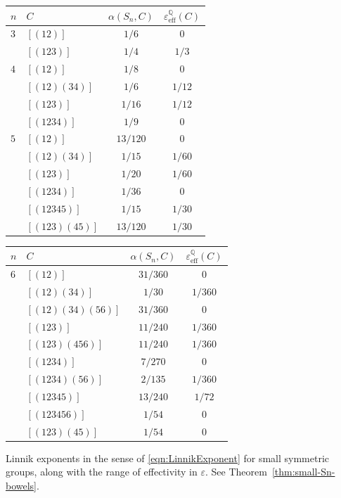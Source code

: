 \documentclass[12pt]{amsart}
\theoremstyle{definition} \newtheorem{definition}[theorem]{Definition}
\theoremstyle{example} \newtheorem{example}[theorem]{Example}
\theoremstyle{remark} \newtheorem{remark}{Remark}[theorem]
\numberwithin{equation}{section}
\numberwithin{theorem}{section}
\renewcommand{\epsilon}{\varepsilon}
\begin{document}
	{\tiny \begin{table}[h]
		\begin{minipage}[t]{0.35\textwidth}
		\begin{tabular}{|l|l|c|c|}
			\hline $n$ & $C$ & $\alpha(S_n,C)$ & $\epsilon_\mathrm{eff}^\mathbb{Q}(C)$ \\ \hline
				$3$ & $[(12)]$ & $1/6$ & $0$ \\
					& $[(123)]$ & $1/4$ & $1/3$ \\ \hline
				$4$ & $[(12)]$ & $1/8$ & $0$ \\
					& $[(12)(34)]$ & $1/6$ & $1/12$ \\
					& $[(123)]$ & $1/16$ & $1/12$ \\
					& $[(1234)]$ & $1/9$ & $0$ \\
					\hline
				$5$ & $[(12)]$ & $13/120$ & $0$ \\
					& $[(12)(34)]$ & $1/15$ & $1/60$ \\
					& $[(123)]$ & $1/20$ & $1/60$ \\
					& $[(1234)]$ & $1/36$ & $0$ \\
					& $[(12345)]$ & $1/15$ & $1/30$ \\
					& $[(123)(45)]$ & $13/120$ & $1/30$ \\ \hline
		\end{tabular}
		\end{minipage}
		\begin{minipage}[t]{0.35\textwidth}
		\begin{tabular}{|l|l|c|c|}
			\hline $n$ & $C$ & $\alpha(S_n,C)$ & $\epsilon_\mathrm{eff}^\mathbb{Q}(C)$ \\ \hline
				$6$ & $[(12)]$ & $31/360$ & $0$ \\
					& $[(12)(34)]$ & $1/30$ & $1/360$ \\
					& $[(12)(34)(56)]$ & $31/360$ & $0$ \\
					& $[(123)]$ & $11/240$ & $1/360$ \\
					& $[(123)(456)]$ & $11/240$ & $1/360$ \\
					& $[(1234)]$ & $7/270$ & $0$ \\
					& $[(1234)(56)]$ & $2/135$ & $1/360$ \\
					& $[(12345)]$ & $13/240$ & $1/72$ \\
					& $[(123456)]$ & $1/54$ & $0$ \\
					& $[(123)(45)]$ & $1/54$ & $0$ \\
					\hline
		\end{tabular}
		\end{minipage}
		\begin{caption} {\label{tbl:small-Sn-intro} Linnik exponents in the sense of \eqref{eqn:LinnikExponent} for small symmetric groups, along with the range of effectivity in $\epsilon$.  See Theorem~\ref{thm:small-Sn-bowels}.}
		\end{caption}
	\end{table} }
	
\end{document}
